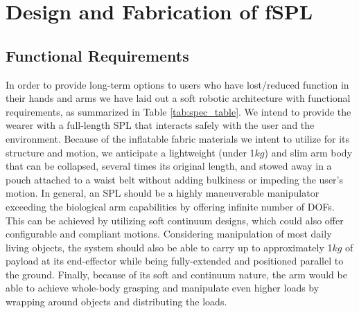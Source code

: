 \documentclass[letterpaper, 10 pt, conference]{ieeeconf}  %
\begin{document}
\section{Design and Fabrication of fSPL}

\subsection{Functional Requirements}
\label{sec:func_req}
In order to provide long-term options to users who have lost/reduced function in their hands and arms we have laid out a soft robotic architecture with functional requirements, as summarized in Table \ref{tab:spec_table}. We intend to provide the wearer with a full-length SPL that interacts safely with the user and the environment. Because of the inflatable fabric materials we intent to utilize for its structure and motion, we anticipate a lightweight (under 1$kg$) and slim arm body that can be collapsed, several times its original length, and stowed away in a pouch attached to a waist belt without adding bulkiness or impeding the user's motion. In general, an SPL should be a highly maneuverable manipulator exceeding the biological arm capabilities by offering infinite number of DOFs. This can be achieved by utilizing soft continuum designs, which could also offer configurable and compliant motions. Considering manipulation of most daily living objects, the system should also be able to carry up to approximately 1$kg$ of payload at its end-effector while being fully-extended and positioned parallel to the ground. Finally, because of its soft and continuum nature, the arm would be able to achieve whole-body grasping and manipulate even higher loads by wrapping around objects and distributing the loads. 
% 



\end{document}
